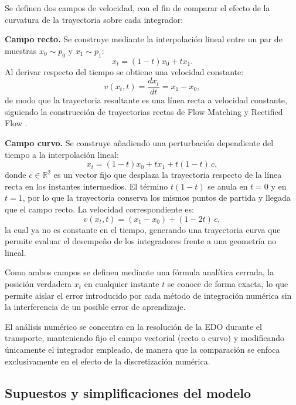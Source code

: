 \documentclass[final,5p,times,twocolumn,authoryear]{elsarticle}
\begin{document}
Se definen dos campos de velocidad, con el fin de comparar el efecto de la curvatura de la trayectoria sobre cada integrador:

\textbf{Campo recto.} Se construye mediante la interpolación lineal entre un par de muestras $x_0\sim p_0$ y $x_1\sim p_1$:
\begin{equation}
    x_t=(1-t)x_0+t x_1.
\end{equation}
\noindent Al derivar respecto del tiempo se obtiene una velocidad constante:
\begin{equation}
    v(x_t,t)=\frac{d x_t}{dt}=x_1-x_0,
\end{equation}
\noindent de modo que la trayectoria resultante es una línea recta a velocidad constante, siguiendo la construcción de trayectorias rectas de Flow Matching y Rectified Flow \citep{lipman2022flow,liu2022flow,pooladian2023multisample}.

\textbf{Campo curvo.} Se construye añadiendo una perturbación dependiente del tiempo a la interpolación lineal:
\begin{equation}
    x_t=(1-t)x_0+t x_1+t(1-t)\,c,
\end{equation}
\noindent donde $c\in\mathbb{R}^2$ es un vector fijo que desplaza la trayectoria respecto de la línea recta en los instantes intermedios. El término $t(1-t)$ se anula en $t=0$ y en $t=1$, por lo que la trayectoria conserva los mismos puntos de partida y llegada que el campo recto. La velocidad correspondiente es:
\begin{equation}
    v(x_t,t)=(x_1-x_0)+(1-2t)\,c,
\end{equation}
\noindent la cual ya no es constante en el tiempo, generando una trayectoria curva que permite evaluar el desempeño de los integradores frente a una geometría no lineal.

Como ambos campos se definen mediante una fórmula analítica cerrada, la posición verdadera $x_t$ en cualquier instante $t$ se conoce de forma exacta, lo que permite aislar el error introducido por cada método de integración numérica sin la interferencia de un posible error de aprendizaje.

El análisis numérico se concentra en la resolución de la EDO durante el transporte, manteniendo fijo el campo vectorial (recto o curvo) y modificando únicamente el integrador empleado, de manera que la comparación se enfoca exclusivamente en el efecto de la discretización numérica.

\subsection{Supuestos y simplificaciones del modelo}
\end{document}
